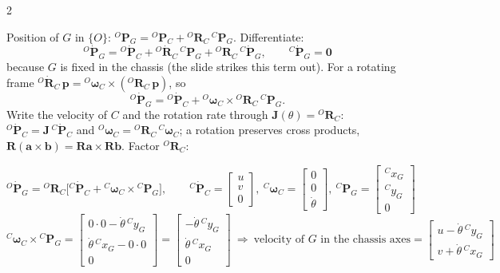\begin{multicols}{2}
\begin{deriv}
Position of $G$ in $\{O\}$: ${}^O\mathbf P_G={}^O\mathbf P_C+{}^O\mathbf R_C\,{}^C\mathbf P_G$. Differentiate:
\[{}^O\dot{\mathbf P}_G={}^O\dot{\mathbf P}_C+{}^O\dot{\mathbf R}_C\,{}^C\mathbf P_G+{}^O\mathbf R_C\,{}^C\dot{\mathbf P}_G,\qquad {}^C\dot{\mathbf P}_G=\mathbf 0\]
because $G$ is fixed in the chassis (the slide strikes this term out). For a rotating frame ${}^O\dot{\mathbf R}_C\,\mathbf p={}^O\boldsymbol\omega_C\times({}^O\mathbf R_C\,\mathbf p)$, so
\[{}^O\dot{\mathbf P}_G={}^O\dot{\mathbf P}_C+{}^O\boldsymbol\omega_C\times{}^O\mathbf R_C\,{}^C\mathbf P_G.\]
Write the velocity of $C$ and the rotation rate through $\mathbf J(\theta)={}^O\mathbf R_C$: ${}^O\dot{\mathbf P}_C=\mathbf J\,{}^C\dot{\mathbf P}_C$ and ${}^O\boldsymbol\omega_C={}^O\mathbf R_C\,{}^C\boldsymbol\omega_C$; a rotation preserves cross products, $\mathbf R(\mathbf a\times\mathbf b)=\mathbf R\mathbf a\times\mathbf R\mathbf b$. Factor ${}^O\mathbf R_C$:
\end{deriv}
\begin{fbx}[Velocity of $G$ \pg{19--20}]
\[{}^O\dot{\mathbf P}_G={}^O\mathbf R_C\Big[{}^C\dot{\mathbf P}_C+{}^C\boldsymbol\omega_C\times{}^C\mathbf P_G\Big],\qquad {}^C\dot{\mathbf P}_C=\begin{bmatrix}u\\v\\0\end{bmatrix},\ {}^C\boldsymbol\omega_C=\begin{bmatrix}0\\0\\\dot\theta\end{bmatrix},\ {}^C\mathbf P_G=\begin{bmatrix}{}^Cx_G\\{}^Cy_G\\0\end{bmatrix}\]
\[{}^C\boldsymbol\omega_C\times{}^C\mathbf P_G=\begin{bmatrix}0\cdot0-\dot\theta\,{}^Cy_G\\ \dot\theta\,{}^Cx_G-0\cdot0\\0\end{bmatrix}=\begin{bmatrix}-\dot\theta\,{}^Cy_G\\ \dot\theta\,{}^Cx_G\\0\end{bmatrix}\ \Rightarrow\ \text{velocity of }G\text{ in the chassis axes}=\begin{bmatrix}u-\dot\theta\,{}^Cy_G\\ v+\dot\theta\,{}^Cx_G\end{bmatrix}\]

\end{fbx}
\end{multicols}
